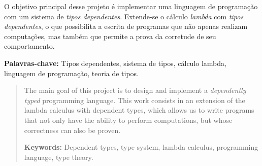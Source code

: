 \documentclass[
       embeddedlogo,
       english,
       lmodern,
       coorientadorbanca,
       noabntexcite
]{ufsc-thesis-rn46-2019}
\theoremstyle{definition}
\begin{document}

\pretextual%
\imprimircapa%
\imprimirfolhaderosto*
\imprimirfolhadecertificacao

\begin{resumo}[Resumo]
       O objetivo principal desse projeto é implementar uma linguagem de programação com um sistema de \emph{tipos dependentes}.
       Extende-se o cálculo \emph{lambda} com \emph{tipos dependentes}, o que possibilita a escrita de programas que não apenas realizam computações, mas também que permite a prova da corretude de seu comportamento.

       \vspace{\baselineskip}
       \textbf{Palavras-chave:} Tipos dependentes, sistema de tipos, cálculo lambda, linguagem de programação, teoria de tipos.
\end{resumo}

\begin{abstract}
       The main goal of this project is to design and implement a \emph{dependently typed} programming language.
       This work consists in an extension of the lambda calculus with dependent types, which allows us to write programs that not only have the ability to perform computations, but whose correctness can also be proven.

       \vspace{\baselineskip}
       \textbf{Keywords:} Dependent types, type system, lambda calculus, programming language, type theory.
\end{abstract}

\listoftables*
\listofalgorithms*
\listoffigures*
\tableofcontents*

\textual%
\end{document}
